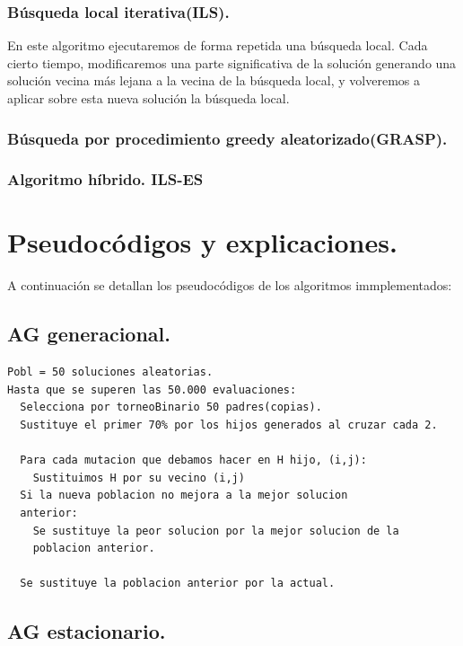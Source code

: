 \subsubsection{Búsqueda local iterativa(ILS).}

En este algoritmo ejecutaremos de forma repetida una búsqueda local. Cada cierto tiempo, modificaremos una parte significativa de la solución generando una solución vecina más lejana a la vecina de la búsqueda local, y volveremos a aplicar sobre esta nueva solución la búsqueda local. 

\subsubsection{Búsqueda por procedimiento greedy aleatorizado(GRASP).}


\subsubsection{Algoritmo híbrido. ILS-ES}

\newpage
\section{Pseudocódigos y explicaciones.}

A continuación se detallan los pseudocódigos de los algoritmos immplementados:\\

\subsection{AG generacional.}

\begin{lstlisting}
Pobl = 50 soluciones aleatorias.
Hasta que se superen las 50.000 evaluaciones:
  Selecciona por torneoBinario 50 padres(copias).
  Sustituye el primer 70% por los hijos generados al cruzar cada 2.
  
  Para cada mutacion que debamos hacer en H hijo, (i,j):
    Sustituimos H por su vecino (i,j)
  Si la nueva poblacion no mejora a la mejor solucion
  anterior:
    Se sustituye la peor solucion por la mejor solucion de la
    poblacion anterior.
  
  Se sustituye la poblacion anterior por la actual.
\end{lstlisting}

\subsection{AG estacionario.}

